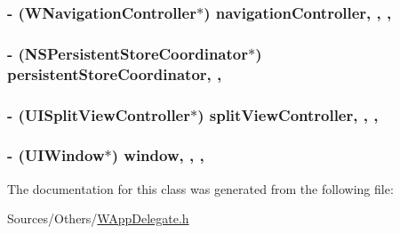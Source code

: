 \hypertarget{interface_w_app_delegate_ad0c4d65d6a08f4445cbcb49384b881c7}{
\subsubsection[{navigation\-Controller}]{\setlength{\rightskip}{0pt plus 5cm}-\/ ({\bf W\-Navigation\-Controller}$\ast$) navigation\-Controller\hspace{0.3cm}{\ttfamily [read]}, {\ttfamily [write]}, {\ttfamily [nonatomic]}, {\ttfamily [strong]}}}\label{interface_w_app_delegate_ad0c4d65d6a08f4445cbcb49384b881c7}
\hypertarget{interface_w_app_delegate_a4c5493acae85106275b50c5e4a1d0127}{
\subsubsection[{persistent\-Store\-Coordinator}]{\setlength{\rightskip}{0pt plus 5cm}-\/ (N\-S\-Persistent\-Store\-Coordinator$\ast$) persistent\-Store\-Coordinator\hspace{0.3cm}{\ttfamily [read]}, {\ttfamily [nonatomic]}, {\ttfamily [strong]}}}\label{interface_w_app_delegate_a4c5493acae85106275b50c5e4a1d0127}
\hypertarget{interface_w_app_delegate_abaf94e45f3650314c04b169d10892408}{
\subsubsection[{split\-View\-Controller}]{\setlength{\rightskip}{0pt plus 5cm}-\/ (U\-I\-Split\-View\-Controller$\ast$) split\-View\-Controller\hspace{0.3cm}{\ttfamily [read]}, {\ttfamily [write]}, {\ttfamily [nonatomic]}, {\ttfamily [strong]}}}\label{interface_w_app_delegate_abaf94e45f3650314c04b169d10892408}
\hypertarget{interface_w_app_delegate_a1e6aa1bbff255b3ef5a285cb2c43bc46}{
\subsubsection[{window}]{\setlength{\rightskip}{0pt plus 5cm}-\/ (U\-I\-Window$\ast$) window\hspace{0.3cm}{\ttfamily [read]}, {\ttfamily [write]}, {\ttfamily [nonatomic]}, {\ttfamily [strong]}}}\label{interface_w_app_delegate_a1e6aa1bbff255b3ef5a285cb2c43bc46}


The documentation for this class was generated from the following file\-:\begin{DoxyCompactItemize}
\item 
Sources/\-Others/\hyperlink{_w_app_delegate_8h}{W\-App\-Delegate.\-h}\end{DoxyCompactItemize}
